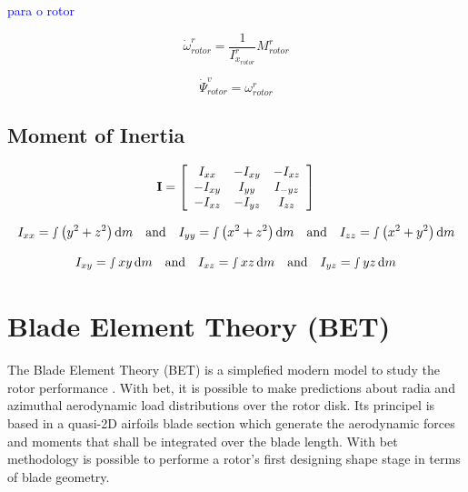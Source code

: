 \textcolor{blue}{para o rotor}

\begin{equation}
    \dot{\omega}^r_{rotor} = \frac{1}{I^r_{x_{rotor}}} M^r_{rotor}
\end{equation}

\begin{equation}
    \dot{\Psi}^v_{rotor} = \omega^r_{rotor} 
\end{equation}


\subsection{Moment of Inertia}


\begin{equation}
    \mathbf{I}=\left[\begin{array}{c c c}{{I_{x x}}}&{{-I_{x y}}}&{{-I_{x z}}}\\ {{-I_{x y}}}&{{I_{y y}}}&{{I_{-y z}}}\\ {{-I_{x z}}}&{{-I_{y z}}}&{{I_{z z}}}\end{array}\right]
\end{equation}

\begin{equation}
    I_{xx} = \smallint  \left( y^2 + z^2 \right) \mathrm{d}m \quad \text{and} \quad I_{yy} = \smallint  \left( x^2 + z^2 \right) \mathrm{d}m \quad \text{and} \quad I_{zz} = \smallint  \left( x^2 + y^2 \right) \mathrm{d}m
\end{equation}


\begin{equation}
    I_{xy} = \smallint  xy \, \mathrm{d}m \quad \text{and} \quad I_{xz} = \smallint  xz \, \mathrm{d}m \quad \text{and} \quad I_{yz} = \smallint  yz \, \mathrm{d}m
\end{equation}




\section{Blade Element Theory (BET)}
\label{sec:BET}

The Blade Element Theory (BET) is a simplefied modern model to study the rotor performance \cite{leishman_principles_2006}. With \gls{bet}, it is possible to make predictions about radia and azimuthal aerodynamic load distributions over the rotor disk. Its principel is based in a quasi-2D airfoils blade section which generate the aerodynamic forces and moments that shall be integrated over the blade length. With \gls{bet} methodology is possible to performe a rotor's first designing shape stage in terms of blade geometry.

